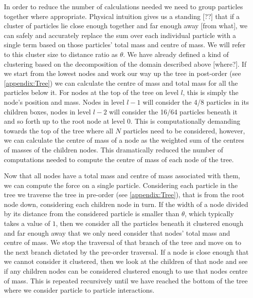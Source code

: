 In order to reduce the number of calculations needed we need to group particles together where appropriate. Physical intuition gives us a standing [??] that if a cluster of particles lie close enough together and far enough away [from what], we can safely and accurately replace the sum over each individual particle with a single term based on those particles' total mass and centre of mass. We will refer to this cluster size to distance ratio as $\theta$. We have already defined a kind of clustering based on the decomposition of the domain described above [where?]. If we start from the lowest nodes and work our way up the tree in post-order (see \cref{appendix:Tree}) we can calculate the centre of mass and total mass for all the particles below it. For nodes at the top of the tree on level $l$, this is simply the node's position and mass. Nodes in level $l-1$ will consider the 4/8 particles in its children boxes, nodes in level $l-2$ will consider the 16/64 particles beneath it and so forth up to the root node at level $0$. This is computationally demanding towards the top of the tree where all $N$ particles need to be considered, however, we can calculate the centre of mass of a node as the weighted sum of the centres of masses of the children nodes. This dramatically reduced the number of computations needed to compute the centre of mass of each node of the tree. 

Now that all nodes have a total mass and centre of mass associated with them, we can compute the force on a single particle. Considering each particle in the tree we traverse the tree in pre-order (see \cref{appendix:Tree}), that is from the root node down, considering each children node in turn. If the width of a node divided by its distance from the considered particle is smaller than $\theta$, which typically takes a value of $1$, then we consider all the particles beneath it clustered enough and far enough away that we only need consider that nodes' total mass and centre of mass. We stop the traversal of that branch of the tree and move on to the next branch dictated by the pre-order traversal. If a node is close enough that we cannot consider it clustered, then we look at the children of that node and see if any children nodes can be considered clustered enough to use that nodes centre of mass. This is repeated recursively until we have reached the bottom of the tree where we consider particle to particle interactions.

